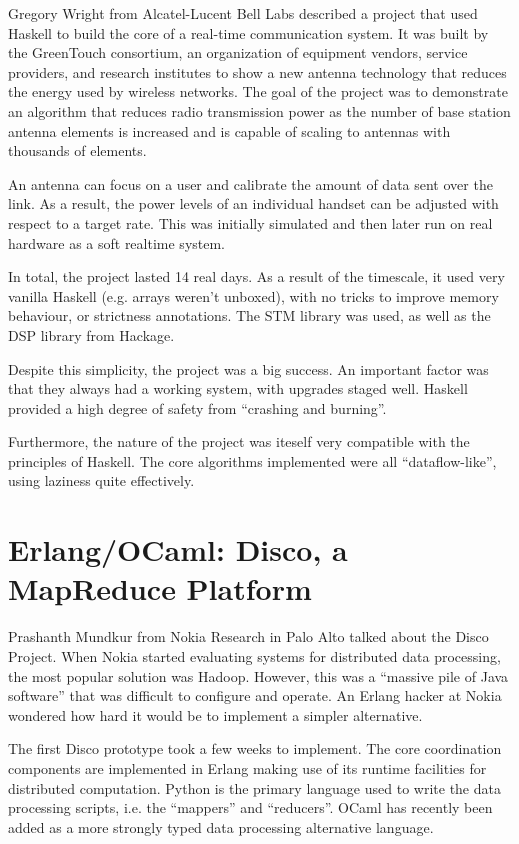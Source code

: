 \documentclass{jfp1}
\begin{document}
Gregory Wright from Alcatel-Lucent Bell Labs described a project that used
Haskell to build the core of a real-time communication system.  It was built by
the GreenTouch consortium, an organization of equipment vendors, service
providers, and research institutes to show a new antenna technology that
reduces the energy used by wireless networks.  The goal of the project was to
demonstrate an algorithm that reduces radio transmission power as the number of
base station antenna elements is increased and is capable of scaling to
antennas with thousands of elements.

An antenna can focus on a user and calibrate the amount of data sent over the
link. As a result, the power levels of an individual handset can be
adjusted with respect to a target rate.  This was initially simulated and then
later run on real hardware as a soft realtime system.

In total, the project lasted 14 real days. As a result of the timescale, it
used very vanilla Haskell (e.g. arrays weren't unboxed), with no tricks to
improve memory behaviour, or strictness annotations. The STM library was used,
as well as the DSP library from Hackage.

Despite this simplicity, the project was a big success. An important factor was
that they always had a working system, with upgrades staged well. Haskell
provided a high degree of safety from ``crashing and burning''.

Furthermore, the nature of the project was iteself very compatible with the
principles of Haskell. The core algorithms implemented were all
``dataflow-like'', using laziness quite effectively.

\section{Erlang/OCaml: Disco, a MapReduce Platform}

Prashanth Mundkur from Nokia Research in Palo Alto talked about the Disco
Project.  When Nokia started evaluating systems for distributed data
processing, the most popular solution was Hadoop. However, this was a ``massive
pile of Java software'' that was difficult to configure and operate. An
Erlang hacker at Nokia wondered how hard it would be to implement a simpler
alternative.

The first Disco prototype took a few weeks to implement. The core coordination
components are implemented in Erlang making use of its runtime facilities for
distributed computation. Python is the primary language used to write the data
processing scripts, i.e. the ``mappers'' and ``reducers''. OCaml has recently been
added as a more strongly typed data processing alternative language.
\end{document}
